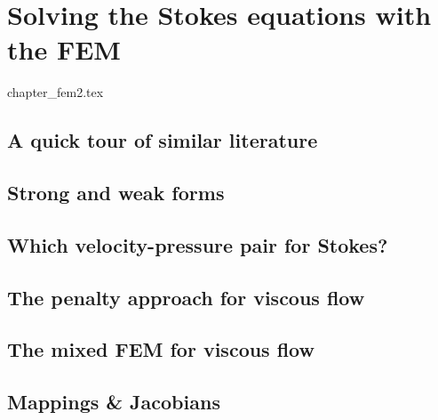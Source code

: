 \chapter{Solving the Stokes equations with the FEM} \label{solvingFEM} %
\begin{flushright} {\tiny {\color{gray} chapter\_fem2.tex}} \end{flushright}

\section{A quick tour of similar literature} 
 

\newpage %
\section{Strong and weak forms}  %

\newpage %
\section{Which velocity-pressure pair for Stokes?}\label{ss:pair} %

\newpage %
\section{The penalty approach for viscous flow}\label{sec:penalty} %

\newpage %
\section{The mixed FEM for viscous flow} \label{sec:mixed}  %

\newpage %
\section{Mappings \& Jacobians \label{ss:mappings}}  %

